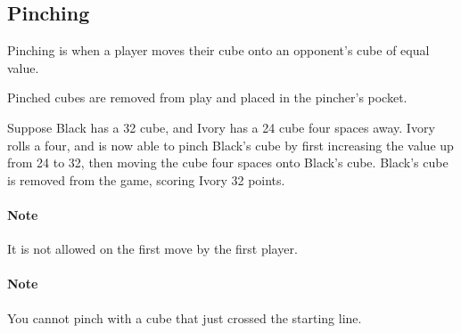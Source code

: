 \subsection{Pinching}\label{sec:pinching}
Pinching is when a player moves their cube onto an opponent's cube of equal value.

Pinched cubes are removed from play and placed in the pincher's pocket.

\example Suppose Black has a 32 cube, and Ivory has a 24 cube four spaces away. 
Ivory rolls a four, and is now able to pinch Black's cube by first increasing the value up from 24 to 32, then moving the cube four spaces onto Black's cube.
Black's cube is removed from the game, scoring Ivory 32 points.

\paragraph{Note} It is not allowed on the first move by the first player.

\paragraph{Note} You cannot pinch with a cube that just crossed the starting line.